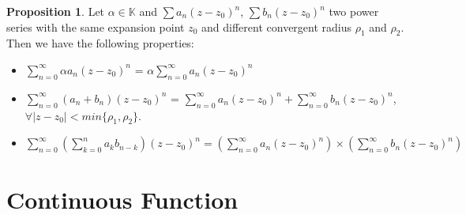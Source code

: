 \documentclass{article}
\theoremstyle{definition}
\newtheorem{prop}{Proposition}[subsection]
\begin{document}
\begin{prop}
Let $\alpha\in\mathbb{K}$ and $\sum a_n (z-z_0)^n$, $\sum b_n (z-z_0)^n$ two power series with the same expansion point $z_0$ and different convergent radius $\rho_1$ and $\rho_2$. Then we have the following properties:
\begin{itemize}
    \item $\sum_{n=0}^{\infty}\alpha a_n(z-z_0)^n$ =  $\alpha\sum_{n=0}^{\infty} a_n(z-z_0)^n$
    \item $\sum_{n=0}^{\infty}(a_n+b_n)(z-z_0)^n$ = $\sum_{n=0}^{\infty} a_n(z-z_0)^n + \sum_{n=0}^{\infty} b_n(z-z_0)^n$, $\forall |z-z_0|<min\{\rho_1, \rho_2\}$.
    \item $\sum_{n=0}^{\infty}(\sum_{k=0}^{n}a_k b_{n-k})(z-z_0)^{n} = (\sum_{n=0}^{\infty} a_n(z-z_0)^n) \times (\sum_{n=0}^{\infty} b_n(z-z_0)^n )$
\end{itemize}
\end{prop}

\section{Continuous Function}
\end{document}
